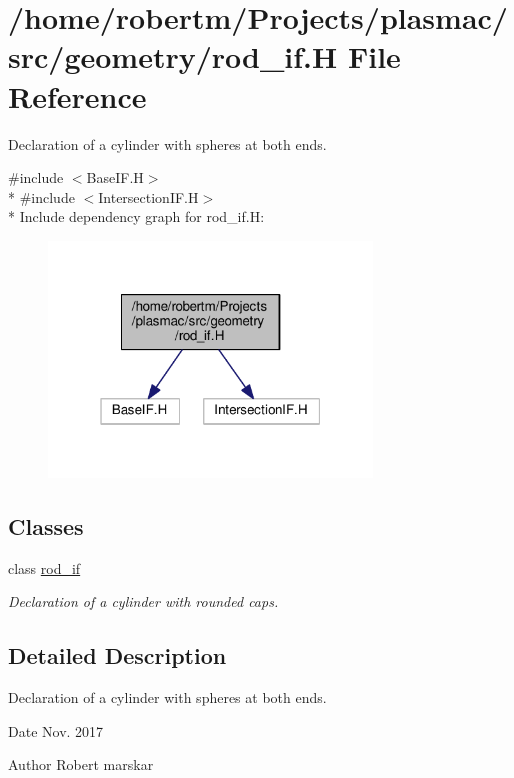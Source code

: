 \hypertarget{rod__if_8H}{}\section{/home/robertm/\+Projects/plasmac/src/geometry/rod\+\_\+if.H File Reference}
\label{rod__if_8H}


Declaration of a cylinder with spheres at both ends.  


{\ttfamily \#include $<$Base\+I\+F.\+H$>$}\\*
{\ttfamily \#include $<$Intersection\+I\+F.\+H$>$}\\*
Include dependency graph for rod\+\_\+if.\+H\+:\nopagebreak
\begin{figure}[H]
\begin{center}
\leavevmode
\includegraphics[width=244pt]{rod__if_8H__incl}
\end{center}
\end{figure}
\subsection*{Classes}
\begin{DoxyCompactItemize}
\item 
class \hyperlink{classrod__if}{rod\+\_\+if}
\begin{DoxyCompactList}\small\item\em Declaration of a cylinder with rounded caps. \end{DoxyCompactList}\end{DoxyCompactItemize}


\subsection{Detailed Description}
Declaration of a cylinder with spheres at both ends. 

\begin{DoxyDate}{Date}
Nov. 2017 
\end{DoxyDate}
\begin{DoxyAuthor}{Author}
Robert marskar 
\end{DoxyAuthor}
